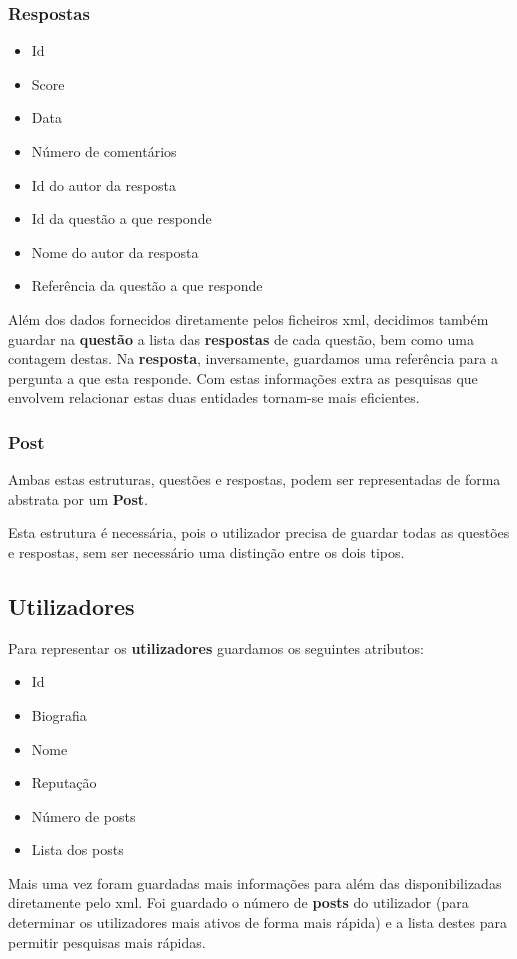 \documentclass[10pt,a4paper]{article}
\begin{document}
        \subsubsection{Respostas}
        \begin{multicols}{2}
        \begin{itemize}
            \item Id
            \item Score
            \item Data
            \item Número de comentários
            \item Id do autor da resposta
            \item Id da questão a que responde
            \item Nome do autor da resposta
            \item Referência da questão a que responde
        \end{itemize}
        \end{multicols}
    Além dos dados fornecidos diretamente pelos ficheiros xml, decidimos também
    guardar na \textbf{questão} a lista das \textbf{respostas} de cada questão,
    bem como uma contagem destas. Na \textbf{resposta}, inversamente, guardamos
    uma referência para a pergunta a que esta responde. Com estas informações
    extra as pesquisas que envolvem relacionar estas duas entidades tornam-se
    mais eficientes.

        \subsubsection{Post}
        Ambas estas estruturas, questões e respostas, podem ser representadas de
        forma abstrata por um \textbf{Post}.

        Esta estrutura é necessária, pois o utilizador precisa de guardar
        todas as questões e respostas, sem ser necessário uma distinção entre
        os dois tipos.

    \subsection{Utilizadores}
    Para representar os \textbf{utilizadores} guardamos os seguintes atributos:
    \begin{multicols}{3}
    \begin{itemize}
            \item Id
            \item Biografia
            \item Nome
            \item Reputação
            \item Número de posts
            \item Lista dos posts
    \end{itemize}
    \end{multicols}
    Mais uma vez foram guardadas mais informações para além das disponibilizadas
    diretamente pelo xml. Foi guardado o número de \textbf{posts} do utilizador
    (para determinar os utilizadores mais ativos de forma mais rápida) e a lista
    destes para permitir pesquisas mais rápidas.
\end{document}
